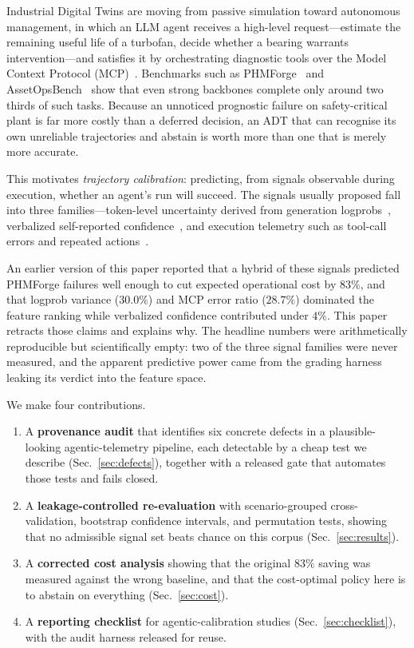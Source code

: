 \documentclass[conference]{IEEEtran}
\begin{document}
Industrial Digital Twins are moving from passive simulation toward autonomous
management, in which an LLM agent receives a high-level request---estimate the
remaining useful life of a turbofan, decide whether a bearing warrants
intervention---and satisfies it by orchestrating diagnostic tools over the
Model Context Protocol (MCP)~\cite{mcp}. Benchmarks such as
PHMForge~\cite{phmforge} and AssetOpsBench~\cite{assetops} show that even strong
backbones complete only around two thirds of such tasks. Because an unnoticed
prognostic failure on safety-critical plant is far more costly than a deferred
decision, an ADT that can recognise its own unreliable trajectories and abstain
is worth more than one that is merely more accurate.

This motivates \emph{trajectory calibration}: predicting, from signals observable
during execution, whether an agent's run will succeed. The signals usually
proposed fall into three families---token-level uncertainty derived from
generation logprobs~\cite{kadavath}, verbalized self-reported
confidence~\cite{xiong}, and execution telemetry such as tool-call errors and
repeated actions~\cite{calvert}.

An earlier version of this paper reported that a hybrid of these signals
predicted PHMForge failures well enough to cut expected operational cost by
$83\%$, and that logprob variance ($30.0\%$) and MCP error ratio ($28.7\%$)
dominated the feature ranking while verbalized confidence contributed under
$4\%$. This paper retracts those claims and explains why. The headline numbers
were arithmetically reproducible but scientifically empty: two of the three
signal families were never measured, and the apparent predictive power came
from the grading harness leaking its verdict into the feature space.

We make four contributions.
\begin{enumerate}
  \item A \textbf{provenance audit} that identifies six concrete defects in a
  plausible-looking agentic-telemetry pipeline, each detectable by a cheap test
  we describe (Sec.~\ref{sec:defects}), together with a released gate that
  automates those tests and fails closed.
  \item A \textbf{leakage-controlled re-evaluation} with scenario-grouped
  cross-validation, bootstrap confidence intervals, and permutation tests,
  showing that no admissible signal set beats chance on this corpus
  (Sec.~\ref{sec:results}).
  \item A \textbf{corrected cost analysis} showing that the original $83\%$
  saving was measured against the wrong baseline, and that the cost-optimal
  policy here is to abstain on everything (Sec.~\ref{sec:cost}).
  \item A \textbf{reporting checklist} for agentic-calibration studies
  (Sec.~\ref{sec:checklist}), with the audit harness released for reuse.
\end{enumerate}
\end{document}
